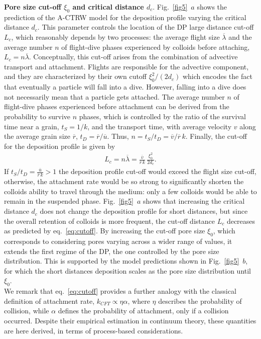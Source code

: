 \documentclass[singlecolumn,pre,notitlepage,preprintnumbers,floatfix,superscriptaddress]{revtex4-1}
\begin{document}
\noindent
\textbf{Pore size cut-off $\xi_0$ and critical distance $d_c$}.
Fig.~\ref{fig5}~$a$ shows the prediction of the A-CTRW model for the deposition profile varying the critical distance $d_c$. This parameter controls the location of the DP large distance cut-off $L_c$, which reasonably depends by two processes: the average flight size $\overline{\lambda}$ and the average number $n$ of flight-dive phases experienced by colloids before attaching, $L_c = n \overline{\lambda}$. Conceptually, this cut-off arises from the combination of advective transport and attachment. Flights are responsible for the advective component, and they are characterized by their own cutoff $\xi_0^2/(2d_c)$ which encodes the fact that eventually a particle will fall into a dive. However, falling into a dive does not necessarily mean that a particle gets attached. The average number $n$ of flight-dive phases experienced before attachment can be derived from the probability to survive $n$ phases, which is controlled by the ratio of the survival time near a grain, $t_S = 1/k$, and the transport time, with average velocity $v$ along the average grain size $\overline{r}$, $t_D = \overline{r} / \overline{u}$. Thus, $n = t_S / t_D = \overline{v}/\overline{r} \, k$. Finally, the cut-off for the deposition profile is given by
%
\begin{align}\label{eq:cutoff}
	L_c = n \overline{\lambda} = \frac{\overline{v}}{\overline{r}\, k} \, \frac{\xi_0^2}{2d_c}.
\end{align}
%
If $t_S / t_D = \frac{\overline{u}}{\overline{r}\, k} > 1$ the deposition profile cut-off would exceed the flight size cut-off, otherwise, the attachment rate would be so strong to significantly shorten the colloids ability to travel through the medium: only a few colloids would be able to remain in the suspended phase. Fig.~\ref{fig5}~$a$ shows that increasing the critical distance $d_c$ does not change the deposition profile for short distances, but since the overall retention of colloids is more frequent, the cut-off distance $L_c$ decreases as predicted by eq.~\eqref{eq:cutoff}. By increasing the cut-off pore size $\xi_0$, which corresponds to considering pores varying across a wider range of values, it extends the first regime of the DP, the one controlled by the pore size distribution. This is supported by the model predictions shown in Fig.~\ref{fig5}~$b$, for which the short distances deposition scales as the pore size distribution until $\xi_0$.\\

\noindent
We remark that eq.~\eqref{eq:cutoff} provides a further analogy with the classical definition of attachment rate, $k_{CFT} \propto \eta \alpha$, where $\eta$ describes the probability of collision, while $\alpha$ defines the probability of attachment, only if a collision occurred. Despite their empirical estimation in continuum theory, these quantities are here derived, in terms of process-based considerations.\\  
\end{document}
